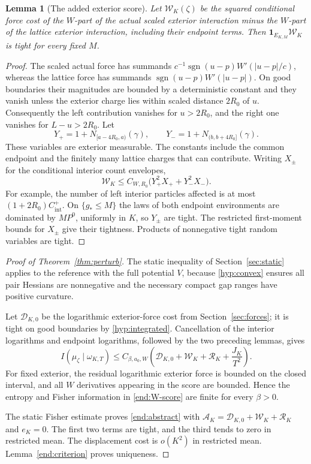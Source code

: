 \documentclass[11pt,reqno]{amsart}
\numberwithin{equation}{section}
\newtheorem{lemma}[theorem]{Lemma}
\theoremstyle{definition}
\newcommand{\1}{\mathbf 1}
\DeclareMathOperator{\sgn}{sgn}
\begin{document}
\begin{lemma}[The added exterior score]\label{end:exterior-W}
Let $\mathcal W_K(\zeta)$ be the squared conditional force cost of the
$W$-part of the actual scaled exterior interaction minus the $W$-part
of the lattice exterior interaction, including their endpoint terms.
Then $\1_{E_{K,M}}\mathcal W_K$ is tight for every fixed $M$.
\end{lemma}

\begin{proof}
The scaled actual force has summands
$c^{-1}\sgn(u-p)W'(|u-p|/c)$, whereas the lattice force has summands
$\sgn(u-p)W'(|u-p|)$. On good boundaries their magnitudes are bounded
by a deterministic constant and they vanish unless the exterior charge
lies within scaled distance $2R_0$ of $u$.
Consequently the left contribution vanishes for $u>2R_0$, and the
right one vanishes for $L-u>2R_0$. Let
\[
Y_+=1+N_{[a-4R_0,a)}(\gamma),\qquad
Y_-=1+N_{(b,b+4R_0]}(\gamma).
\]
These variables are exterior measurable. The constants include the
common endpoint and the finitely many lattice charges that can contribute.
Writing $X_\pm$ for the conditional interior count envelopes,
\[
\mathcal W_K\le C_{W,R_0}
\bigl(Y_+^2X_++Y_-^2X_-\bigr).
\]
For example, the number of left interior particles affected is at most
$(1+2R_0)C_{\mathrm{int}}^+$.
On $\{g_*\le M\}$ the laws of both endpoint environments
are dominated by $M P^0$, uniformly in $K$, so $Y_\pm$ are tight.
The restricted first-moment bounds for $X_\pm$ give their tightness.
Products of nonnegative tight random variables are tight.
\end{proof}

\begin{proof}[Proof of Theorem~\ref{thm:perturb}]
The static inequality of Section~\ref{sec:static} applies to the
reference with the full potential $V$, because \eqref{hyp:convex}
ensures all pair Hessians are nonnegative and the necessary compact
gap ranges have positive curvature.

Let $\mathcal D_{K,0}$ be the logarithmic exterior-force cost from
Section~\ref{sec:forces}; it is tight on good boundaries by
\eqref{hyp:integrated}. Cancellation of the interior logarithms and
endpoint logarithms, followed by the two preceding lemmas, gives
\begin{equation}\label{end:W-score}
I(\mu_\zeta\mid\omega_{K,T})
\le C_{\beta,a_0,W}
\left(\mathcal D_{K,0}+\mathcal W_K+\mathcal R_K+\frac{J_K}{T^2}\right).
\end{equation}
For fixed exterior, the residual logarithmic exterior force is bounded
on the closed interval, and all $W$ derivatives appearing in the score
are bounded. Hence the entropy and Fisher information in
\eqref{end:W-score} are finite for every $\beta>0$.

The static Fisher estimate proves \eqref{end:abstract} with
$\mathcal A_K=\mathcal D_{K,0}+\mathcal W_K+\mathcal R_K$ and $e_K=0$.
The first two terms are tight, and the third tends to zero in
restricted mean. The displacement cost is $o(K^2)$ in restricted mean.
Lemma~\ref{end:criterion} proves uniqueness.
\end{proof}
\end{document}
